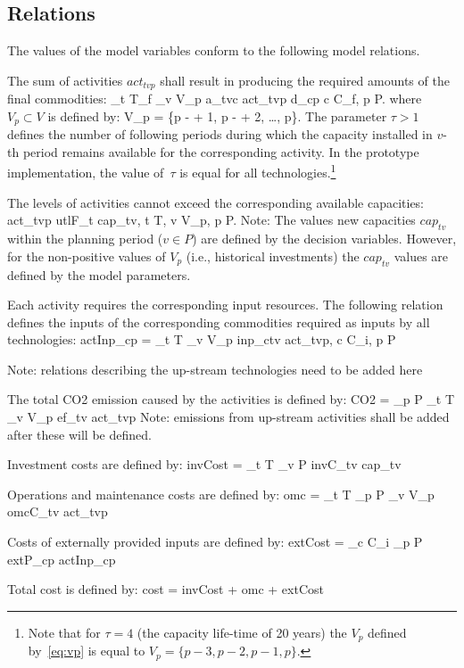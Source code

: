 \documentclass[a4paper,12pt]{article}
\begin{document}
\subsection{Relations}\label{sec:rel}
The values of the model variables conform to the following model relations.
\btlb
\item The sum of activities $act_{tvp}$ shall result in producing the required
	amounts of the final commodities:
	\be
	\sum_{t \in T_f} \sum_{v \in V_p} a_{tvc} \cdot act_{tvp} \ge d_{cp} \quad
		c \in C_f, p \in P.
	\ee
	where $V_p \subset V$ is defined by:
	\be \label{eq:vp}
		V_p = \{p - \tau + 1, p - \tau + 2, \dots, p\}.
	\ee
	The parameter $\tau > 1$ defines the number of following periods during which the
	capacity installed in $v$-th period remains available for the corresponding
	activity. In the prototype implementation, the value of~$\tau$ is equal
	for all technologies.\footnote{
	Note that for $\tau = 4$ (the capacity life-time of 20 years) the
	$V_p$ defined by~\eqref{eq:vp} is equal to
	$V_p = \{p - 3, p - 2, p - 1, p\}$.}
\item The levels of activities cannot exceed the corresponding available
	capacities:
	\be
		act_{tvp} \le utlF_t \cdot cap_{tv}, \quad t \in T, v \in V_p, p \in P.
	\ee
	Note: The values new capacities $cap_{tv}$ within the planning period
	($v \in P$) are defined by the decision variables.
	However, for the non-positive values of $V_{p}$ (i.e., historical investments)
	the $cap_{tv}$ values are defined by the model parameters.
\item Each activity requires the corresponding input resources.
	The following relation defines the inputs of the corresponding commodities
	required as inputs by all technologies:
	\be
		actInp_{cp} = \sum_{t \in T} \sum_{v \in V_p} inp_{ctv} \cdot act_{tvp},
		\quad  c \in C_i,\; p \in P
	\ee
\item Note: relations describing the up-stream technologies need to be added here
\item The total CO2 emission caused by the activities is defined by:
	\be
		CO2 = \sum_{p \in P} \sum_{t \in T} \sum_{v \in V_p} ef_{tv} \cdot act_{tvp}
	\ee
	Note: emissions from up-stream activities shall be added after these will be defined.
\item Investment costs are defined by:
	\be
		invCost = \sum_{t \in T} \sum_{v \in P} invC_{tv} \cdot cap_{tv}
	\ee
\item Operations and maintenance costs are defined by:
	\be
		omc = \sum_{t \in T} \sum_{p \in P} \sum_{v \in V_p} omcC_{tv} \cdot act_{tvp}
	\ee
\item Costs of externally provided inputs are defined by:
	\be
		extCost = \sum_{c \in C_i} \sum_{p \in P} extP_{cp} \cdot actInp_{cp}
	\ee
\item Total cost is defined by:
	\be
		cost = invCost + omc + extCost
	\ee
\etl
\end{document}

